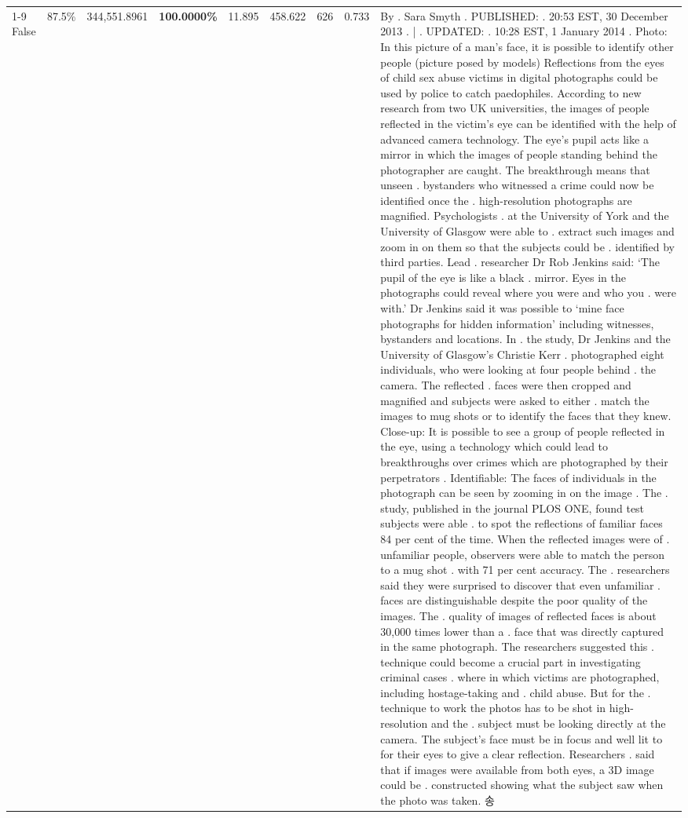 \begin{table}[H]
\begin{tabular}{lllrlllll}
\cline{1-9}
False & 87.5\% & 344,551.8961 & \bfseries \color{red} 100.0000\% & 11.895 & 458.622 & 626 & 0.733 & By . Sara Smyth . PUBLISHED: . 20:53 EST, 30 December 2013 . | . UPDATED: . 10:28 EST, 1 January 2014 . Photo: In this picture of a man's face, it is possible to identify other people (picture posed by models) Reflections from the eyes of child sex abuse victims in digital photographs could be used by police to catch paedophiles. According to new research from two UK universities, the images of people reflected in the victim's eye can be identified with the help of advanced camera technology. The eye's pupil acts like a mirror in which the images of people standing behind the photographer are caught. The breakthrough means that unseen . bystanders who witnessed a crime could now be identified once the . high-resolution photographs are magnified. Psychologists . at the University of York and the University of Glasgow were able to . extract such images and zoom in on them so that the subjects could be . identified by third parties. Lead . researcher Dr Rob Jenkins said: ‘The pupil of the eye is like a black . mirror. Eyes in the photographs could reveal where you were and who you . were with.' Dr Jenkins said it was possible to ‘mine face photographs for hidden information' including witnesses, bystanders and locations. In . the study, Dr Jenkins and the University of Glasgow's Christie Kerr . photographed eight individuals, who were looking at four people behind . the camera. The reflected . faces were then cropped and magnified and subjects were asked to either . match the images to mug shots or to identify the faces that they knew. Close-up: It is possible to see a group of people reflected in the eye, using a technology which could lead to breakthroughs over crimes which are photographed by their perpetrators . Identifiable: The faces of individuals in the photograph can be seen by zooming in on the image . The . study, published in the journal PLOS ONE, found test subjects were able . to spot the reflections of familiar faces 84 per cent of the time. When the reflected images were of . unfamiliar people, observers were able to match the person to a mug shot . with 71 per cent accuracy. The . researchers said they were surprised to discover that even unfamiliar . faces are distinguishable despite the poor quality of the images. The . quality of images of reflected faces is about 30,000 times lower than a . face that was directly captured in the same photograph. The researchers suggested this . technique could become a crucial part in investigating criminal cases . where in which victims are photographed, including hostage-taking and . child abuse. But for the . technique to work the photos has to be shot in high-resolution and the . subject must be looking directly at the camera. The subject's face must be in focus and well lit to for their eyes to give a clear reflection. Researchers . said that if images were available from both eyes, a 3D image could be . constructed showing what the subject saw when the photo was taken. 송 \\

\end{tabular}
\end{table}

